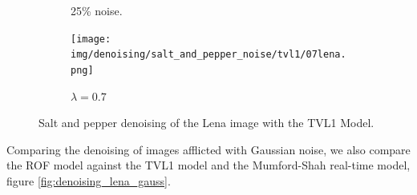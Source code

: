 \documentclass{scrreprt}
\begin{document}
\begin{figure}[!ht]
\begin{subfigure}[b]{0.31\textwidth}
                    \caption{25\% noise.}
                \end{subfigure}
                \begin{subfigure}[b]{0.31\textwidth}
                    \texttt{[image: img/denoising/salt\_and\_pepper\_noise/tvl1/07lena.png]}
                    \caption{$\lambda = 0.7$}
                \end{subfigure}
                \caption[Salt and pepper denoising example: TVL1.]{Salt and pepper denoising of the Lena image with the TVL1 Model.}
            \label{fig:denoising_lena_tvl1_sap}
            \end{figure}

        Comparing the denoising of images afflicted with Gaussian noise, we also compare the ROF model against the TVL1 model and the Mumford-Shah real-time model, figure \ref{fig:denoising_lena_gauss}.
\end{document}
